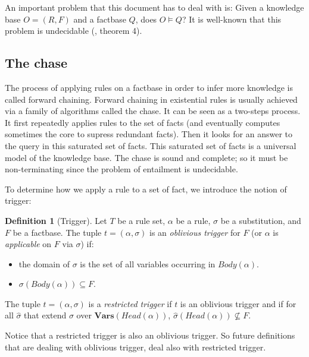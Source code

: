 \documentclass{article}
\theoremstyle{definition}
\newtheorem{definition}{Definition}[section]
\theoremstyle{remark}
\newcommand{\Vars}{\textbf{Vars}}
\begin{document}
An important problem that this document has to deal with is: Given a knowledge base $O=(R,F)$ and a factbase $Q$,  does $O \models Q$? It  is  well-known  that  this  problem  is  undecidable (\cite{NP2}, theorem 4). 



\subsection{The chase}

The process of applying rules on a factbase in order to infer more knowledge is called forward chaining.   Forward  chaining  in  existential  rules  is  usually achieved  via  a  family  of  algorithms  called the  chase. It can be seen as a two-steps process. It first repeatedly applies rules to the set of facts (and eventually computes sometimes the core to supress redundant facts). Then it looks for an answer to the query in this saturated set of facts. This saturated set of facts is a universal model of the knowledge base. The chase is sound and complete; so it must be non-terminating since the problem of entailment is undecidable.

To determine how we apply a rule to a set of fact, we introduce the notion of trigger:

\begin{definition}[Trigger]
Let $T$ be a rule set, $\alpha$ be a rule, $\sigma$ be a substitution, and $F$ be a factbase. The tuple $t = (\alpha,\sigma)$ is an \emph{oblivious trigger} for $F$ (or $\alpha$ is \emph{applicable} on $F$ via $\sigma$) if: 
\begin{itemize}
\item the domain of $\sigma$ is the set of all variables occurring in $Body(\alpha)$.
\item $\sigma(Body(\alpha)) \subseteq F$.
\end{itemize}
The tuple $t = (\alpha,\sigma)$ is a \emph{restricted trigger} if $t$ is an oblivious trigger and if for all $\hat \sigma$ that extend $\sigma$ over $\Vars(\textit{Head}(\alpha))$, $\hat \sigma(Head(\alpha)) \nsubseteq F$.

\end{definition} 

Notice that a restricted trigger is also an oblivious trigger. So future definitions that are dealing with oblivious trigger, deal also with restricted trigger.
\end{document}
